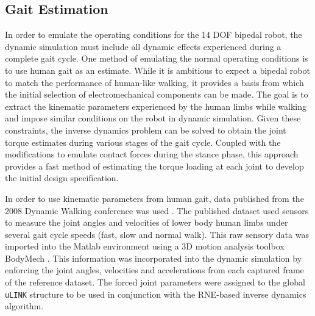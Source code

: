 \subsection{Gait Estimation} %
\label{sec:gait_estimation}
	
In order to emulate the operating conditions for the 14 DOF bipedal robot, the dynamic simulation must include all dynamic effects experienced during a complete gait cycle. One method of emulating the normal operating conditions is to use human gait as an estimate. While it is ambitious to expect a bipedal robot to match the performance of human-like walking, it provides a basis from which the initial selection of electromechanical components can be made. The goal is to extract the kinematic parameters experienced by the human limbs while walking and impose similar conditions on the robot in dynamic simulation. Given these constraints, the inverse dynamics problem can be solved to obtain the joint torque estimates during various stages of the gait cycle. Coupled with the modifications to emulate contact forces during the stance phase, this approach provides a fast method of estimating the torque loading at each joint to develop the initial design specification. 
	
In order to use kinematic parameters from human gait, data published from the 2008 Dynamic Walking conference was used \cite{dw2008}. The published dataset used sensors to measure the joint angles and velocities of lower body human limbs under several gait cycle speeds (fast, slow and normal walk). This raw sensory data was imported into the Matlab environment using a 3D motion analysis toolbox BodyMech \cite{bodymech}. This information was incorporated into the dynamic simulation by enforcing the joint angles, velocities and accelerations from each captured frame of the reference dataset. The forced joint parameters were assigned to the global \texttt{uLINK} structure to be used in conjunction with the RNE-based inverse dynamics algorithm. 


